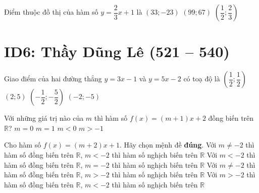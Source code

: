 \begin{ex}%
	Điểm thuộc đồ thị của hàm số $ y=\dfrac{2}{3}x+1 $ là
	{$(33;-23)$}
	{\True $(99;67)$}
	{$\left( \dfrac{1}{2};\dfrac{2}{3}\right) $}
\end{ex}



\section*{ID6: Thầy Dũng Lê (521 -- 540)}
\begin{ex}%
	Giao điểm của hai đường thẳng $ y=3x-1 $ và $ y=5x-2 $ có toạ độ là
	\choice
	{\True $\left( \dfrac{1}{2};\dfrac{1}{2}\right)  $}
	{$ (2;5) $}
	{$\left(-\dfrac{1}{2};-\dfrac{5}{2}\right)  $}
	{$ (-2;-5)$}
\end{ex}

\begin{ex}%
	Với những giá trị nào của $ m $ thì hàm số $ f(x)=(m+1)x+2 $ đồng biến trên $ \mathbb{R} $?
	\choice
	{$ m=0 $}
	{$ m=1 $}
	{$ m<0 $}
	{\True $ m>-1 $}
\end{ex}

\begin{ex}%
	Cho hàm số $ f(x)=(m+2)x+1 $. Hãy chọn mệnh đề \textbf{đúng}.
	\choice
	{Với $ m \ne -2 $ thì hàm số đồng biến trên $ \mathbb{R} $, $ m<-2 $ thì hàm số nghịch biến trên $ \mathbb{R} $}
	{Với $ m < -2 $ thì hàm số đồng biến trên $ \mathbb{R} $, $ m=-2 $ thì hàm số nghịch biến trên $ \mathbb{R} $}
	{Với $ m \ne -2 $ thì hàm số đồng biến trên $ \mathbb{R} $, $ m>-2 $ thì hàm số nghịch biến trên $ \mathbb{R} $}
	{\True Với $ m > -2 $ thì hàm số đồng biến trên $ \mathbb{R} $, $ m<-2 $ thì hàm số nghịch biến trên $ \mathbb{R} $}
\end{ex}

